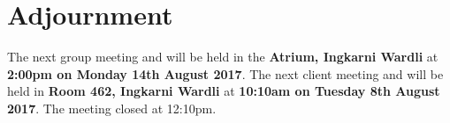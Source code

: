 \documentclass{article}
\begin{document}
\section{Adjournment}
	The next group meeting and will be held in the {\bf Atrium, Ingkarni Wardli} at {\bf 2:00pm on Monday 14th August 2017}.\newline
    The next client meeting and will be held in {\bf Room 462, Ingkarni Wardli} at {\bf 10:10am on Tuesday 8th August 2017}.\newline
The meeting closed at 12:10pm.
\end{document}
